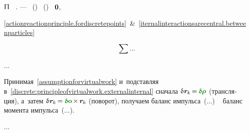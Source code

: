 \begin{otherlanguage}{russian}
\vspace{-0.4em}\noindent
{}
$\potentialenergyinmechanics$~
.
%
\:---
~()
%
~()
~${\bm{0}}$\hbox{\hspace{.1ex},}

\eqref{actionreactionprinciple.fordiscretepoints}~\&~\eqref{iternalinteractionsarecentral.betweenparticles}

\begin{equation*}
\sum \ldots
\end{equation*}

...

Принимая~\eqref{assumptionforvirtualwork}
и~подставляя в~\eqref{discrete:principleofvirtualwork.externalinternal}
сначала ${\variation{\hspace{.1ex}\locationvector_{\hspace{-0.1ex}k}} \hspace{-0.16ex} = \hspace{-0.08ex} \constvarvector{\hspace{-0.1ex}\bm{\rho}}}$
(трансляция),
а~затем ${\variation{\hspace{.1ex}\locationvector_{\hspace{-0.1ex}k}} \hspace{-0.16ex} = \hspace{-0.08ex} \constvarvector{\bm{o}} \hspace{-0.2ex} \times \hspace{-0.1ex} \locationvector_{\hspace{-0.1ex}k}}$
(поворот),
получаем баланс импульса~(...)
~%
баланс момента импульса~(...).

...



\end{otherlanguage}


